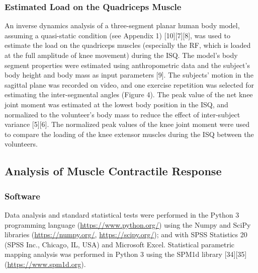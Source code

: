 \documentclass[utf8]{FrontiersinHarvard}
\begin{document}
\subsubsection{Estimated Load on the Quadriceps Muscle}
An inverse dynamics analysis of a three-segment planar human body model, assuming a quasi-static condition (see Appendix 1) [10][7][8], was used to estimate the load on the quadriceps muscles (especially the RF, which is loaded at the full amplitude of knee movement) during the ISQ.
The model's body segment properties were estimated using anthropometric data and the subject’s body height and body mass as input parameters [9].
The subjects' motion in the sagittal plane was recorded on video, and one exercise repetition was selected for estimating the inter-segmental angles (Figure 4).
The peak value of the net knee joint moment was estimated at the lowest body position in the ISQ,
and normalized to the volunteer’s body mass to reduce the effect of inter-subject variance [5][6].
The normalized peak values of the knee joint moment were used to compare the loading of the knee extensor muscles during the ISQ between the volunteers.

\subsection{Analysis of Muscle Contractile Response} \label{ss:analysis}

\subsubsection{Software}
Data analysis and standard statistical tests were performed in the Python 3 programming language (\url{https://www.python.org/}) using the Numpy and SciPy libraries (\url{https://numpy.org/}, \url{https://scipy.org/});
and with SPSS Statistics 20 (SPSS Inc., Chicago, IL, USA) and Microsoft Excel.
Statistical parametric mapping analysis was performed in Python 3 using the SPM1d library [34][35] (\url{https://www.spm1d.org}).
\end{document}
